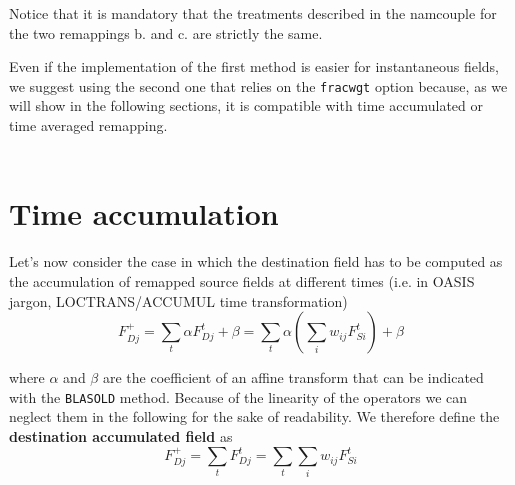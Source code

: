 Notice that it is mandatory that the treatments described in the namcouple for the two remappings b. and c. are strictly the same.

Even if the implementation of the first method is easier for instantaneous fields, we suggest using the second one that relies on the {\tt fracwgt} option because, as we will show in the following sections, it is compatible with time accumulated or time averaged remapping.\\\\


\section{Time accumulation}

Let's now consider the case in which the destination field has to be computed as the accumulation of remapped source fields at different times (i.e. in OASIS jargon, LOCTRANS/ACCUMUL time transformation)
\begin{equation}\label{destination_accumulatedblasoldcoeff}
F^+_{Dj}=\sum_t{\alpha F^t_{Dj}+\beta}=\sum_t{\alpha\left(\sum_i{w_{ij}F^t_{Si}}\right)+\beta}
\end{equation}

where \(\alpha\) and \(\beta\) are the coefficient of an affine transform that can be indicated with the {\tt BLASOLD} method. Because of the linearity of the operators we can neglect them in the following for the sake of readability. We therefore define the {\bf destination accumulated field} as
\begin{equation}\label{destination_accumulatedblasold}
F^+_{Dj}=\sum_t{F^t_{Dj}}=\sum_t{\sum_i{w_{ij}F^t_{Si}}}
\end{equation}

